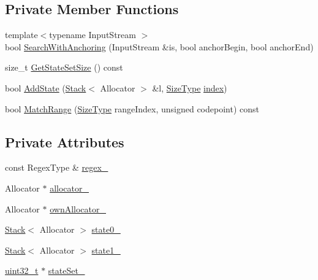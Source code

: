 \subsection*{Private Member Functions}
\begin{DoxyCompactItemize}
\item 
{\footnotesize template$<$typename Input\+Stream $>$ }\\bool \hyperlink{classinternal_1_1GenericRegexSearch_a850b4f0e1cf3f7e0f6c02ae3d7da654a}{Search\+With\+Anchoring} (Input\+Stream \&is, bool anchor\+Begin, bool anchor\+End)
\item 
size\+\_\+t \hyperlink{classinternal_1_1GenericRegexSearch_a12ddb6629c0be52801d291a8e5005c06}{Get\+State\+Set\+Size} () const
\item 
bool \hyperlink{classinternal_1_1GenericRegexSearch_aa16ed718784de143ec64861b2b662ea4}{Add\+State} (\hyperlink{classinternal_1_1Stack}{Stack}$<$ Allocator $>$ \&l, \hyperlink{rapidjson_8h_a5ed6e6e67250fadbd041127e6386dcb5}{Size\+Type} \hyperlink{imgui__impl__opengl3__loader_8h_a57f14e05b1900f16a2da82ade47d0c6d}{index})
\item 
bool \hyperlink{classinternal_1_1GenericRegexSearch_a1a9c7b4f977805912d1c1f1866442fbe}{Match\+Range} (\hyperlink{rapidjson_8h_a5ed6e6e67250fadbd041127e6386dcb5}{Size\+Type} range\+Index, unsigned codepoint) const
\end{DoxyCompactItemize}
\subsection*{Private Attributes}
\begin{DoxyCompactItemize}
\item 
const Regex\+Type \& \hyperlink{classinternal_1_1GenericRegexSearch_aaec69557b0641a19b337ebd44b6d7a7b}{regex\+\_\+}
\item 
Allocator $\ast$ \hyperlink{classinternal_1_1GenericRegexSearch_aa87a7caf0054f4e65446ecd91aba367c}{allocator\+\_\+}
\item 
Allocator $\ast$ \hyperlink{classinternal_1_1GenericRegexSearch_a804573e03eb673a9633f638fe3e3b62f}{own\+Allocator\+\_\+}
\item 
\hyperlink{classinternal_1_1Stack}{Stack}$<$ Allocator $>$ \hyperlink{classinternal_1_1GenericRegexSearch_a6b44c058a10cff21c2e3d20d32b84eba}{state0\+\_\+}
\item 
\hyperlink{classinternal_1_1Stack}{Stack}$<$ Allocator $>$ \hyperlink{classinternal_1_1GenericRegexSearch_a029a67ab36e5cb1b1394fc7a688c7cda}{state1\+\_\+}
\item 
\hyperlink{stdint_8h_a435d1572bf3f880d55459d9805097f62}{uint32\+\_\+t} $\ast$ \hyperlink{classinternal_1_1GenericRegexSearch_a2f697f3edbd1e1f91d3f4535e494f4c2}{state\+Set\+\_\+}
\end{DoxyCompactItemize}


